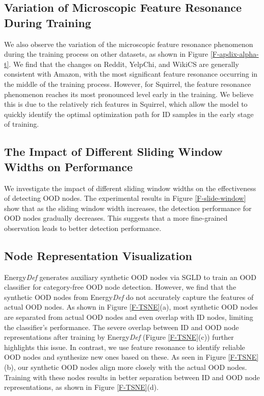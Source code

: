 \subsection{Variation of Microscopic Feature Resonance During Training}
We also observe the variation of the microscopic feature resonance phenomenon during the training process on other datasets, as shown in Figure \ref{F-apdix-alpha-t}. We find that the changes on Reddit, YelpChi, and WikiCS are generally consistent with Amazon, with the most significant feature resonance occurring in the middle of the training process. However, for Squirrel, the feature resonance phenomenon reaches its most pronounced level early in the training. We believe this is due to the relatively rich features in Squirrel, which allow the model to quickly identify the optimal optimization path for ID samples in the early stage of training.






\subsection{The Impact of Different Sliding Window Widths on Performance} \label{subsec-Apdix-SW}

We investigate the impact of different sliding window widths on the effectiveness of detecting OOD nodes. The experimental results in Figure \ref{F-slide-window} show that as the sliding window width increases, the detection performance for OOD nodes gradually decreases. This suggests that a more fine-grained observation leads to better detection performance.



\subsection{Node Representation Visualization}
Energy\textit{Def} generates auxiliary synthetic OOD nodes via SGLD to train an OOD classifier for category-free OOD node detection. However, we find that the synthetic OOD nodes from Energy\textit{Def} do not accurately capture the features of actual OOD nodes. As shown in Figure \ref{F-TSNE}(a), most synthetic OOD nodes are separated from actual OOD nodes and even overlap with ID nodes, limiting the classifier's performance. The severe overlap between ID and OOD node representations after training by Energy\textit{Def} (Figure \ref{F-TSNE}(c)) further highlights this issue. In contrast, we use feature resonance to identify reliable OOD nodes and synthesize new ones based on these. As seen in Figure \ref{F-TSNE}(b), our synthetic OOD nodes align more closely with the actual OOD nodes. Training with these nodes results in better separation between ID and OOD node representations, as shown in Figure \ref{F-TSNE}(d).


